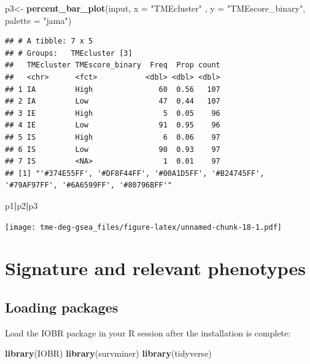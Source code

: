 \documentclass[
  12pt,
]{book}
\newenvironment{Shaded}{\begin{snugshade}}{\end{snugshade}}
\newcommand{\AttributeTok}[1]{\textcolor[rgb]{0.13,0.29,0.53}{#1}}
\newcommand{\FunctionTok}[1]{\textcolor[rgb]{0.13,0.29,0.53}{\textbf{#1}}}
\newcommand{\NormalTok}[1]{#1}
\newcommand{\OtherTok}[1]{\textcolor[rgb]{0.56,0.35,0.01}{#1}}
\newcommand{\SpecialCharTok}[1]{\textcolor[rgb]{0.81,0.36,0.00}{\textbf{#1}}}
\newcommand{\StringTok}[1]{\textcolor[rgb]{0.31,0.60,0.02}{#1}}
\begin{document}
\begin{Shaded}
\begin{Highlighting}[]
\NormalTok{p3}\OtherTok{\textless{}{-}} \FunctionTok{percent\_bar\_plot}\NormalTok{(input, }\AttributeTok{x =} \StringTok{"TMEcluster"}\NormalTok{ , }\AttributeTok{y =} \StringTok{"TMEscore\_binary"}\NormalTok{, }\AttributeTok{palette =} \StringTok{"jama"}\NormalTok{)}
\end{Highlighting}
\end{Shaded}

\begin{verbatim}
## # A tibble: 7 x 5
## # Groups:   TMEcluster [3]
##   TMEcluster TMEscore_binary  Freq  Prop count
##   <chr>      <fct>           <dbl> <dbl> <dbl>
## 1 IA         High               60  0.56   107
## 2 IA         Low                47  0.44   107
## 3 IE         High                5  0.05    96
## 4 IE         Low                91  0.95    96
## 5 IS         High                6  0.06    97
## 6 IS         Low                90  0.93    97
## 7 IS         <NA>                1  0.01    97
## [1] "'#374E55FF', '#DF8F44FF', '#00A1D5FF', '#B24745FF', '#79AF97FF', '#6A6599FF', '#80796BFF'"
\end{verbatim}

\begin{Shaded}
\begin{Highlighting}[]
\NormalTok{p1}\SpecialCharTok{|}\NormalTok{p2}\SpecialCharTok{|}\NormalTok{p3}
\end{Highlighting}
\end{Shaded}

\texttt{[image: tme-deg-gsea\_files/figure-latex/unnamed-chunk-18-1.pdf]}

\hypertarget{signature-and-relevant-phenotypes}{%
\chapter{\texorpdfstring{\textbf{Signature and relevant phenotypes}}{Signature and relevant phenotypes}}\label{signature-and-relevant-phenotypes}}

\hypertarget{loading-packages-2}{%
\section{Loading packages}\label{loading-packages-2}}

Load the IOBR package in your R session after the installation is complete:

\begin{Shaded}
\begin{Highlighting}[]
\FunctionTok{library}\NormalTok{(IOBR)}
\FunctionTok{library}\NormalTok{(survminer)}
\FunctionTok{library}\NormalTok{(tidyverse)}
\end{Highlighting}
\end{Shaded}
\end{document}
